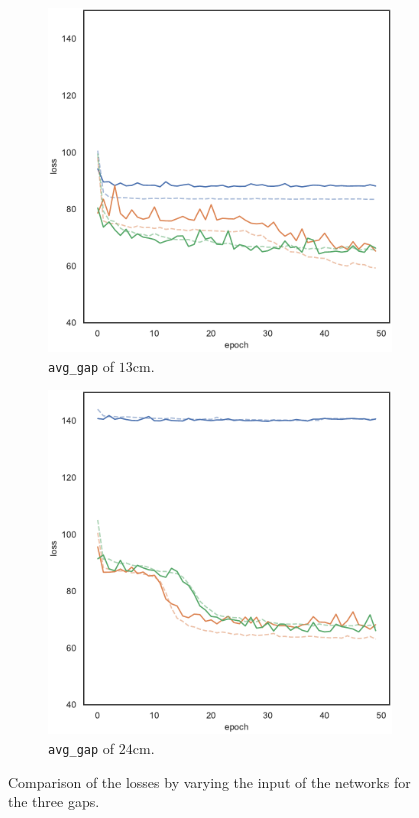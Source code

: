\begin{figure}[!htb]
\begin{subfigure}[h]{0.3\textwidth}
		\includegraphics[width=\textwidth]{contents/images/task1/loss-distributed-gap_13@copy}%
		\caption{\texttt{avg\_gap} of $13$\gls{cm}.}
	\end{subfigure}
	\hfill
	\begin{subfigure}[h]{0.3\textwidth}
		\centering
		\includegraphics[width=\textwidth]{contents/images/task1/loss-distributed-gap_24@copy}
		\caption{\texttt{avg\_gap} of $24$\gls{cm}.}
	\end{subfigure}
	\caption[Losses summary of the first set of experiments.]{Comparison 
		of the losses by varying the input of the networks for the three gaps.}
	\label{fig:distloss81324}
\end{figure}

